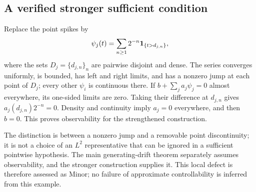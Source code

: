 \documentclass[10pt]{article}
\begin{document}
\subsection*{A verified stronger sufficient condition}
Replace the point spikes by \[\psi_j(t)=\sum_{n\ge1}2^{-n}{\bf1}_{\{t>d_{j,n}\}},\] where the sets \(D_j=\{d_{j,n}\}_n\) are pairwise disjoint and dense. The series converges uniformly, is bounded, has left and right limits, and has a nonzero jump at each point of \(D_j\); every other \(\psi_i\) is continuous there. If \(b+\sum_j a_j\psi_j=0\) almost everywhere, its one-sided limits are zero. Taking their difference at \(d_{j,n}\) gives \(a_j(d_{j,n})2^{-n}=0\). Density and continuity imply \(a_j=0\) everywhere, and then \(b=0\). This proves observability for the strengthened construction.\par
The distinction is between a nonzero jump and a removable point discontinuity; it is not a choice of an \(L^2\) representative that can be ignored in a sufficient pointwise hypothesis. The main generating-drift theorem separately assumes observability, and the stronger construction supplies it. This local defect is therefore assessed as Minor; no failure of approximate controllability is inferred from this example.\par
\end{document}
